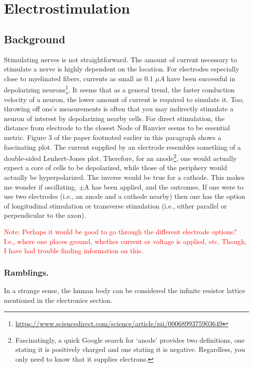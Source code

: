\documentclass[12pt]{report}
\begin{document}
\section{Electrostimulation}

\subsection{Background}
Stimulating nerves is not straightforward. The amount of current necessary to stimulate a nerve is highly dependent on the location. For electrodes especially close to myelinated fibers, currents as small as 0.1 $\mu A$ have been successful in depolarizing neurons\footnote{\url{https://www.sciencedirect.com/science/article/pii/0006899375903649}}. It seems that as a general trend, the faster conduction velocity of a neuron, the lower amount of current is required to simulate it. Too, throwing off one's measurements is often that you may indirectly stimulate a neuron of interest by depolarizing nearby cells. For direct stimulation, the distance from electrode to the closest Node of Ranvier seems to be essential metric. Figure 3 of the paper footnoted earlier in this paragraph shows a fascinating plot. The current supplied by an electrode resembles something of a double-sided Lenhert-Jones plot. Therefore, for an anode\footnote{Fascinatingly, a quick Google search for `anode' provides two definitions, one stating it is positively charged and one stating it is negative. Regardless, you only need to know that it supplies electrons.}, one would actually expect a core of cells to be depolarized, while those of the periphery would actually be hyperpolarized. The inverse would be true for a cathode. This makes me wonder if oscillating, $\pm$A has been applied, and the outcomes. If one were to use two electrodes (i.e., an anode and a cathode nearby) then one has the option of longitudinal stimulation or transverse stimulation (i.e., either parallel or perpendicular to the axon).\newline

\textcolor{red}{Note: Perhaps it would be good to go through the different electrode options? I.e., where one places ground, whether current or voltage is applied, etc. Though, I have had trouble finding information on this.}

\subsubsection{Ramblings.}
In a strange sense, the human body can be considered the infinite resistor lattice mentioned in the electronics section. 
\end{document}
